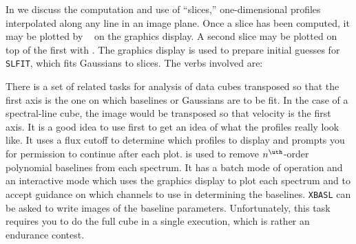      In  we discuss the computation and use of ``slices,''
one-dimensional profiles interpolated along any line in an image
plane.  Once a slice has been computed, it may be plotted by {\tt
{}} on the graphics display.  A second slice may be plotted on
top of the first with {\tt {}}\@.  The graphics
display is used to prepare initial guesses for {\tt SLFIT}, which fits
Gaussians to slices.  The verbs involved are:


     There is a set of related tasks for analysis of data cubes
transposed so that the first axis is the one on which baselines or
Gaussians are to be fit.  In the case of a spectral-line cube, the
image would be transposed so that velocity is the first axis.  It is a
good idea to use {\tt {}} first to get an idea of what the
profiles really look like.  It uses a flux cutoff to determine which
profiles to display and prompts you for permission to continue after
each plot. {\tt {}} is used to remove $n^{\uth}$-order
polynomial baselines from each spectrum.  It has a batch mode of
operation and an interactive mode which uses the graphics display to
plot each spectrum and to accept guidance on which channels to use in
determining the baselines.  {\tt XBASL} can be asked to write images
of the baseline parameters.  Unfortunately, this task requires you to
do the full cube in a single execution, which is rather an endurance
contest. 

